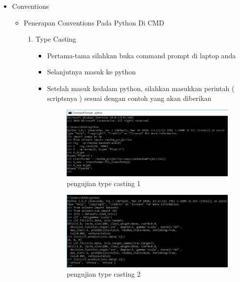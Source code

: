 \par
\begin{itemize}
\item Conventions
\begin{itemize}
\item Penerapan Conventions Pada Python Di CMD
\begin{enumerate}
\item Type Casting
\begin{itemize}
\item Pertama-tama silahkan buka command prompt di laptop anda
\item Selanjutnya masuk ke python 
\item Setelah masuk kedalam python, silahkan masukkan perintah ( scriptsnya ) sesuai dengan contoh yang akan diberikan
\par

\begin{figure}[ht]
\centering
\includegraphics[scale=0.3]{figures/typecast1.jpg}
\caption{pengujian type casting 1}
\label{contoh}
\end{figure}

\par

\par
\par

\begin{figure}[ht]
\centering
\includegraphics[scale=0.3]{figures/typecast2.jpg}
\caption{pengujian type casting 2}
\label{contoh}
\end{figure}


\end{itemize}
\end{enumerate}
\end{itemize}
\end{itemize}
